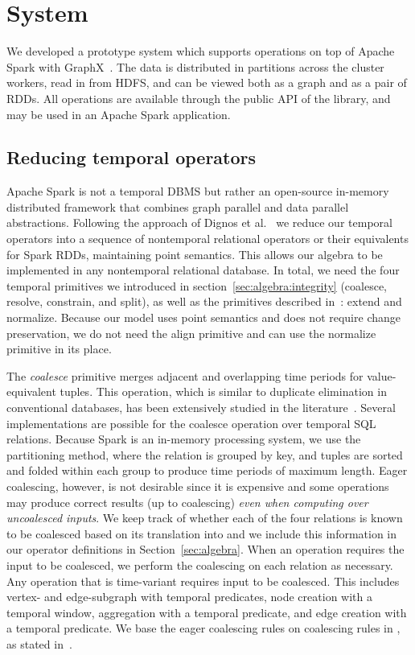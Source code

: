\section{System}
\label{sec:sys}

We developed a prototype system \ql which supports \tga operations on
top of Apache Spark with GraphX~\cite{DBLP:conf/osdi/GonzalezXDCFS14}.
The data is distributed in partitions across the cluster workers, read
in from HDFS, and can be viewed both as a graph and as a pair of RDDs.
All \tg operations are available through the public API of the \ql
library, and may be used in an Apache Spark application.

\subsection{Reducing temporal operators}

Apache Spark is not a temporal DBMS but rather an open-source
in-memory distributed framework that combines graph parallel and data
parallel abstractions.  Following the approach of Dignos et
al.~\cite{Dignos2012} we reduce our temporal operators into a sequence
of nontemporal relational operators or their equivalents for Spark
RDDs, maintaining point semantics.  This allows our algebra to be
implemented in any nontemporal relational database.  In total, we need
the four temporal primitives we introduced in
section~\ref{sec:algebra:integrity} (coalesce, resolve, constrain, and
split), as well as the primitives described in~\cite{Dignos2012}:
extend and normalize.  Because our model uses point semantics and does
not require change preservation, we do not need the align primitive
and can use the normalize primitive in its place.

The {\em coalesce} primitive merges adjacent and overlapping time
periods for value-equivalent tuples.  This operation, which is similar
to duplicate elimination in conventional databases, has been
extensively studied in the
literature~\cite{DBLP:conf/vldb/BohlenSS96,DBLP:journals/sigmod/Zimanyi06}.
Several implementations are possible for the coalesce operation over
temporal SQL relations.  Because Spark is an in-memory processing
system, we use the partitioning method, where the relation is grouped
by key, and tuples are sorted and folded within each group to produce
time periods of maximum length.  Eager coalescing, however, is not
desirable since it is expensive and some operations may produce
correct results (up to coalescing) {\em even when computing over
  uncoalesced inputs}.  We keep track of whether each of the four \tve
relations is known to be coalesced based on its translation into \tra
and we include this information in our operator definitions in
Section~\ref{sec:algebra}.  When an operation requires the input to be
coalesced, we perform the coalescing on each relation as necessary.
Any operation that is time-variant requires input to be coalesced.
This includes vertex- and edge-subgraph with temporal predicates, node
creation with a temporal window, aggregation with a temporal
predicate, and edge creation with a temporal predicate.  We base the
eager coalescing rules on coalescing rules in \tra, as stated
in~\cite{DBLP:conf/vldb/BohlenSS96}.  

